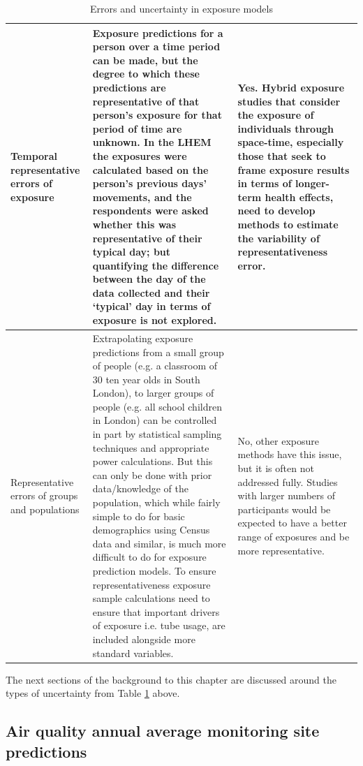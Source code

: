 \begin{landscape}
\begin{table}[]
\begin{tabular}{ | p{3cm} | p{13.2cm} | p{7.7cm} |}
        Temporal representative errors of exposure  &   Exposure predictions for a person over a time period can be made, but the degree to which these predictions are representative of that person’s exposure for that period of time are unknown. In the LHEM the exposures were calculated based on the person’s previous days’ movements, and the respondents were asked whether this was representative of their typical day; but quantifying the difference between the day of the data collected and their ‘typical’ day in terms of exposure is not explored.         &    Yes. Hybrid exposure studies that consider the exposure of individuals through space-time, especially those that seek to frame exposure results in terms of longer-term health effects, need to develop methods to estimate the variability of representativeness error.       \\ \hline
        
        Representative errors of groups and populations  &   Extrapolating exposure predictions from a small group of people (e.g. a classroom of 30 ten year olds in South London), to larger groups of people (e.g. all school children in London) can be controlled in part by statistical sampling techniques and appropriate power calculations. But this can only be done with prior data/knowledge of the population, which while fairly simple to do for basic demographics using Census data and similar, is much more difficult to do for exposure prediction models. To ensure representativeness exposure sample calculations need to ensure that important drivers of exposure i.e. tube usage, are included alongside more standard variables.        &   No, other exposure methods have this issue, but it is often not addressed fully. Studies with larger numbers of participants would be expected to have a better range of exposures and be more representative.        \\ \hline
\end{tabular}
\caption{Errors and uncertainty in exposure models}
\label{tab:exposure_error_table}
\end{table}

\end{landscape}

\restoregeometry

The next sections of the background to this chapter are discussed around the types of uncertainty from Table \ref{tab:exposure_error_table} above.

\subsection{Air quality annual average monitoring site predictions}
\label{air_quality_annual_average_predictions}

